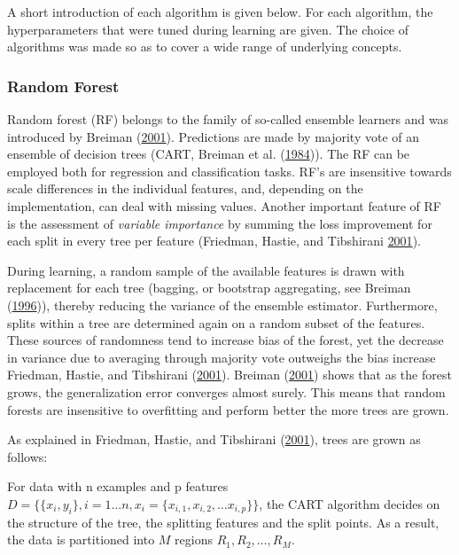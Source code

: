 \documentclass[
  11pt,
  a4paper,
  DIV=12,captions=tableheading,oneside,titlepage]{scrbook}
\begin{document}
A short introduction of each algorithm is given below. For each algorithm, the hyperparameters that were tuned during learning are given. The choice of algorithms was made so as to cover a wide range of underlying concepts.

\hypertarget{methods-rf}{%
\subsubsection{Random Forest}\label{methods-rf}}

Random forest (RF) belongs to the family of so-called ensemble learners and was introduced by Breiman (\protect\hyperlink{ref-breiman2001rf}{2001}). Predictions are made by majority vote of an ensemble of decision trees (CART, Breiman et al. (\protect\hyperlink{ref-breiman1984classification}{1984})). The RF can be employed both for regression and classification tasks. RF's are insensitive towards scale differences in the individual features, and, depending on the implementation, can deal with missing values. Another important feature of RF is the assessment of \emph{variable importance} by summing the loss improvement for each split in every tree per feature (Friedman, Hastie, and Tibshirani \protect\hyperlink{ref-friedman2001elements}{2001}).

During learning, a random sample of the available features is drawn with replacement for each tree (bagging, or bootstrap aggregating, see Breiman (\protect\hyperlink{ref-breiman1996bagging}{1996})), thereby reducing the variance of the ensemble estimator. Furthermore, splits within a tree are determined again on a random subset of the features. These sources of randomness tend to increase bias of the forest, yet the decrease in variance due to averaging through majority vote outweighs the bias increase Friedman, Hastie, and Tibshirani (\protect\hyperlink{ref-friedman2001elements}{2001}). Breiman (\protect\hyperlink{ref-breiman2001rf}{2001}) shows that as the forest grows, the generalization error converges almost surely. This means that random forests are insensitive to overfitting and perform better the more trees are grown.

As explained in Friedman, Hastie, and Tibshirani (\protect\hyperlink{ref-friedman2001elements}{2001}), trees are grown as follows:

For data with n examples and p features \(D = \{\{x_i,y_i\}, i=1 \ldots n, x_i=\{x_{i,1}, x_{i,2}, \ldots x_{i,p}\}\}\), the CART algorithm decides on the structure of the tree, the splitting features and the split points. As a result, the data is partitioned into \(M\) regions \(R_1, R_2, \ldots, R_M\).
\end{document}
